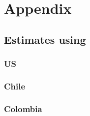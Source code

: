 \documentclass[11pt]{article}
\begin{document}
\pagebreak
\newpage












\pagebreak
\newpage

\section*{Appendix} \label{Appendix}
\subsection{Estimates using \cite{Ackerberg2015}}
\subsubsection{US}

\pagebreak
\newpage
\subsubsection{Chile}

\pagebreak
\newpage
\subsubsection{Colombia}

\end{document}
